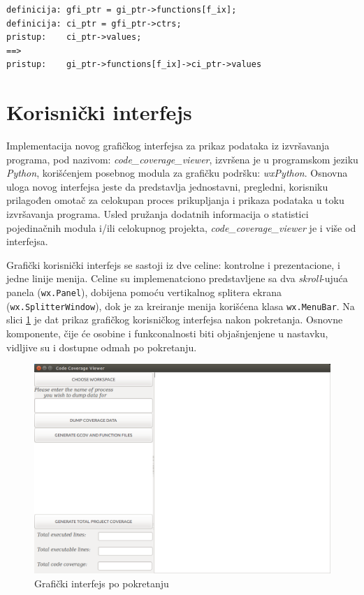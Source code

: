 \documentclass[12pt,oneside]{memoir}
\newcommand{\kod}[1]{\texttt{#1}}
\newcommand{\strano}[1]{\textit{#1}}
\begin{document}
\begin{lstlisting}[caption={Pristup instrumentalitacionim strukturama},frame=single, label=pristup]
definicija: gfi_ptr = gi_ptr->functions[f_ix];
definicija: ci_ptr = gfi_ptr->ctrs;
pristup:    ci_ptr->values;
==>	
pristup:    gi_ptr->functions[f_ix]->ci_ptr->values
\end{lstlisting}

\section{Korisnički interfejs}

Implementacija novog grafičkog interfejsa za prikaz podataka iz izvršavanja programa, pod nazivom: \strano{code\_coverage\_viewer}, izvršena je u programskom jeziku \strano{Python}, korišćenjem posebnog modula za grafičku podršku: \strano{wxPython}. Osnovna uloga novog interfejsa jeste da predstavlja jednostavni, pregledni, korisniku prilagođen omotač za celokupan proces prikupljanja i prikaza podataka u toku izvršavanja programa. Usled pružanja dodatnih informacija o statistici pojedinačnih modula i/ili celokupnog projekta, \strano{code\_coverage\_viewer} je i više od interfejsa.

Grafički korisnički interfejs se sastoji iz dve celine: kontrolne i prezentacione, i jedne linije menija. Celine su implemenatciono predstavljene sa dva \strano{skroll}-ujuća panela (\kod{wx.Panel}), dobijena pomoću vertikalnog splitera ekrana (\kod{wx.SplitterWindow}), dok je za kreiranje menija korišćena klasa \kod{wx.MenuBar}. Na slici \ref{fig:GUI1} je dat prikaz grafičkog korisničkog interfejsa nakon pokretanja. Osnovne komponente, čije će osobine i funkconalnosti biti objašnjenjene u  nastavku, vidljive su i dostupne odmah po pokretanju. 

\begin{figure}[!ht]
  \centering
  \includegraphics[width=\textwidth]{img/GUI_1_ng.png}
  \caption{Grafički interfejs po pokretanju}
  \label{fig:GUI1}
\end{figure}
\end{document}
